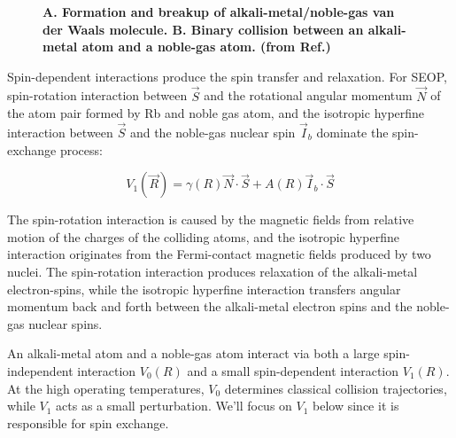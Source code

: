 \begin{figure}[t!]
	\centering
	\caption{{\bf A. Formation and breakup of alkali-metal/noble-gas van der Waals molecule. B. Binary collision between an alkali-metal atom and a noble-gas atom. (from Ref.\@ \cite{WalkerHapper})}}
	\label{SpinExchange}
\end{figure}

Spin-dependent interactions produce the spin transfer and relaxation. For SEOP, spin-rotation interaction between $\vec{S}$ and the rotational angular momentum $\vec{N}$ of the atom pair formed by Rb and noble gas atom, and the isotropic hyperfine interaction between $\vec{S}$ and the noble-gas nuclear spin $\vec{I}_{b}$ dominate the spin-exchange process:

\begin{equation}\label{V1eq}
V_{1}(\vec{R})=\gamma(R)\vec{N}\cdot \vec{S}+A(R)\vec{I}_{b}\cdot \vec{S}
\end{equation}

The spin-rotation interaction is caused by the magnetic fields from relative motion of the charges of the colliding atoms, and the isotropic hyperfine interaction originates from the Fermi-contact magnetic fields produced by two nuclei. The spin-rotation interaction produces relaxation of the alkali-metal electron-spins, while the isotropic hyperfine interaction transfers angular momentum back and forth between the alkali-metal electron spins and the noble-gas nuclear spins.

An alkali-metal atom and a noble-gas atom interact via both a large spin-independent interaction $V_{0}(R)$ and a small spin-dependent interaction $V_{1}(R)$. At the high operating temperatures, $V_{0}$ determines classical collision trajectories, while $V_{1}$ acts as a small perturbation. We'll focus on $V_{1}$ below since it is responsible for spin exchange.

